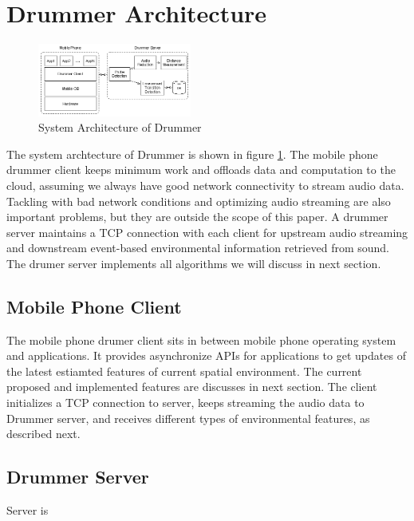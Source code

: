\section{Drummer Architecture}
\label{sec:arch}


\begin{figure}[H]
\centering
\includegraphics[width=0.45\textwidth]{./fig/arch.eps}
\caption{System Architecture of Drummer }
\label{fig:arch}
\end{figure}


The system archtecture of Drummer is shown in figure \ref{fig:arch}. The mobile phone drummer 
client keeps minimum work and offloads data and computation to the cloud, assuming we always
have good network connectivity to stream audio data. Tackling with bad network conditions 
\cite{cuervo2010maui} and optimizing audio streaming \cite{farleycsense} are also important 
problems, but they are outside the scope of this paper. A drummer server maintains a TCP connection
with each client for upstream audio streaming and downstream event-based environmental information
retrieved from sound. The drumer server implements all algorithms we will discuss in next section.


\subsection{Mobile Phone Client}

The mobile phone drumer client sits in between mobile phone operating system and applications.
It provides asynchronize APIs for applications to get updates of the latest estiamted features of
current spatial environment. The current proposed and implemented features are discusses in next section.
The client initializes a TCP connection to server, keeps streaming the audio data to Drummer server, 
and receives different types of environmental features, as described next.



\subsection{Drummer Server}

Server is 